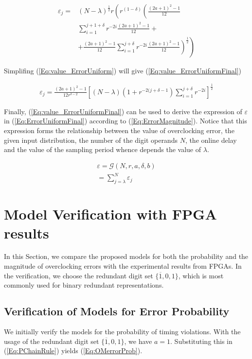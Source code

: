 \documentclass[journal]{IEEEtran}
\begin{document}
\begin{eqnarray}\label{Eq:value_ErrorUniform}
{\varepsilon}_j =& (N-\lambda)^{\frac{1}{2}} r  \left( r^{(1-\delta)} \left(\frac{(2a+1)^{2}-1}{12} \right. \right. \nonumber \\
& \sum_{i=1}^{j+1+\delta} r^{-2i} \frac{(2a+1)^{2}-1}{12} + \nonumber \\
&\left. \left. +\frac{(2a+1)^{2}-1}{12}   \sum_{i=1}^{j+\delta} r^{-2i} \frac{(2a+1)^{2}-1}{12}\right)^{\frac{1}{2}}\right)
\end{eqnarray}

Simplifing (\ref{Eq:value_ErrorUniform}) will give (\ref{Eq:value_ErrorUniformFinal})

\begin{eqnarray}\label{Eq:value_ErrorUniformFinal}
{\varepsilon}_j=    \frac{(2a+1)^2-1}{12r^{\delta-2} } \left[ (N-\lambda) (1+r^{-2(j+\delta -1})   \sum_{i=1}^{j+\delta} r^{-2i}\right]^\frac{1}{2}   
\end{eqnarray}


Finally, (\ref{Eq:value_ErrorUniformFinal}) can be used to derive the expression of $\varepsilon$ in (\ref{Eq:ErrorUniformFinal}) according to (\ref{Eq:ErrorMagnitude}). Notice that this expression forms the relationship between the value of overclocking error, the given input distribution, the number of the digit operands $N$, the online delay and the value of the sampling period whence depends the value of $\lambda$.

\begin{equation}\label{Eq:ErrorUniformFinal}
\begin{array}{l}
{\varepsilon} =   \mathcal{G}(N,r, a, \delta,b)\\
=\sum_{j=\lambda}^N    {\varepsilon}_j
\end{array}
\end{equation}



\section{Model Verification with FPGA results}

In this Section, we compare the proposed models for both the probability and the magnitude of overclocking errors with the experimental results from FPGAs. In the verification, we choose the redundant digit set $\{\overline{1},0,1\}$, which is most commonly used for binary redundant representations. 

\subsection{Verification of Models for Error Probability}
We initially verify the models for the probability of timing violations. With the usage of the redundant digit set $\{\overline{1},0,1\}$, we have $a=1$. Substituting this in (\ref{Eq:PChainRule}) yields (\ref{Eq:OMerrorProb}).
\end{document}
